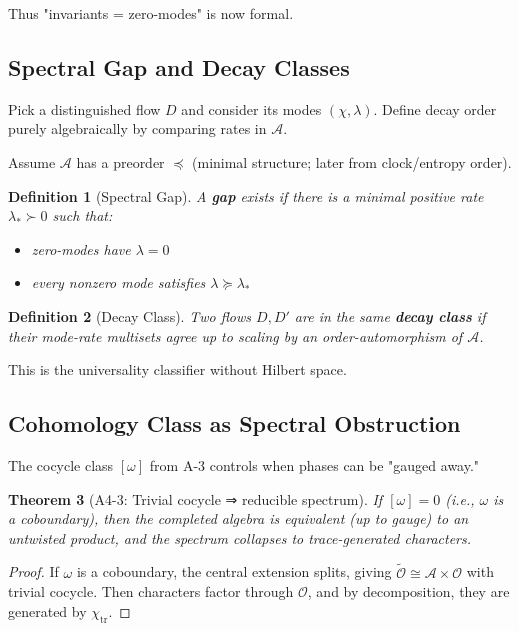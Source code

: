 \documentclass[12pt, oneside]{article}
\newtheorem{theorem}{Theorem}[section]
\newtheorem{definition}[theorem]{Definition}
\DeclareMathOperator{\tr}{tr}
\newcommand{\A}{\mathcal{A}}
\newcommand{\Opr}{\mathcal{O}}
\newcommand{\wtilde}{\widetilde}
\begin{document}
Thus "invariants = zero-modes" is now formal.

\subsection{Spectral Gap and Decay Classes}

Pick a distinguished flow $D$ and consider its modes $(\chi, \lambda)$. Define decay order purely algebraically by comparing rates in $\A$.

Assume $\A$ has a preorder $\preceq$ (minimal structure; later from clock/entropy order).

\begin{definition}[Spectral Gap]
A \textbf{gap} exists if there is a minimal positive rate $\lambda_* \succ 0$ such that:
\begin{itemize}
    \item zero-modes have $\lambda = 0$
    \item every nonzero mode satisfies $\lambda \succeq \lambda_*$
\end{itemize}
\end{definition}

\begin{definition}[Decay Class]
Two flows $D, D'$ are in the same \textbf{decay class} if their mode-rate multisets agree up to scaling by an order-automorphism of $\A$.
\end{definition}

This is the universality classifier without Hilbert space.

\subsection{Cohomology Class as Spectral Obstruction}

The cocycle class $[\omega]$ from A-3 controls when phases can be "gauged away."

\begin{theorem}[A4-3: Trivial cocycle ⇒ reducible spectrum]
If $[\omega] = 0$ (i.e., $\omega$ is a coboundary), then the completed algebra is equivalent (up to gauge) to an untwisted product, and the spectrum collapses to trace-generated characters.
\end{theorem}

\begin{proof}
If $\omega$ is a coboundary, the central extension splits, giving $\wtilde{\Opr} \cong \A \times \Opr$ with trivial cocycle. Then characters factor through $\Opr$, and by decomposition, they are generated by $\chi_{\tr}$.
\end{proof}
\end{document}
